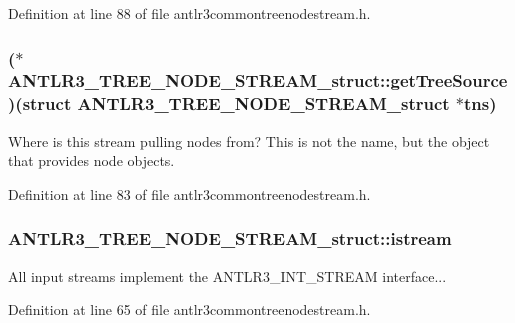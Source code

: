 Definition at line 88 of file antlr3commontreenodestream.\-h.

\hypertarget{struct_a_n_t_l_r3___t_r_e_e___n_o_d_e___s_t_r_e_a_m__struct_a8f818b3650b82b6c9a666ed2fed60c85}{
\subsubsection[{get\-Tree\-Source}]{($\ast$ A\-N\-T\-L\-R3\-\_\-\-T\-R\-E\-E\-\_\-\-N\-O\-D\-E\-\_\-\-S\-T\-R\-E\-A\-M\-\_\-struct\-::get\-Tree\-Source)(struct {\bf A\-N\-T\-L\-R3\-\_\-\-T\-R\-E\-E\-\_\-\-N\-O\-D\-E\-\_\-\-S\-T\-R\-E\-A\-M\-\_\-struct} $\ast$tns)}}\label{struct_a_n_t_l_r3___t_r_e_e___n_o_d_e___s_t_r_e_a_m__struct_a8f818b3650b82b6c9a666ed2fed60c85}
Where is this stream pulling nodes from? This is not the name, but the object that provides node objects. 

Definition at line 83 of file antlr3commontreenodestream.\-h.

\hypertarget{struct_a_n_t_l_r3___t_r_e_e___n_o_d_e___s_t_r_e_a_m__struct_ae3d949bb86a708bafeb611157db2b131}{
\subsubsection[{istream}]{ A\-N\-T\-L\-R3\-\_\-\-T\-R\-E\-E\-\_\-\-N\-O\-D\-E\-\_\-\-S\-T\-R\-E\-A\-M\-\_\-struct\-::istream}}\label{struct_a_n_t_l_r3___t_r_e_e___n_o_d_e___s_t_r_e_a_m__struct_ae3d949bb86a708bafeb611157db2b131}
All input streams implement the A\-N\-T\-L\-R3\-\_\-\-I\-N\-T\-\_\-\-S\-T\-R\-E\-A\-M interface... 

Definition at line 65 of file antlr3commontreenodestream.\-h.

